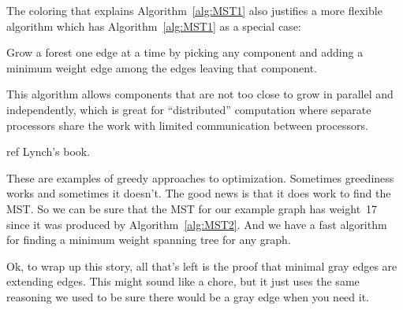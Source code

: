 The coloring that explains Algorithm~\ref{alg:MST1} also justifies a more
flexible algorithm which has Algorithm~\ref{alg:MST1} as a special case:
\begin{algorithm}\label{alg:MST3}
  Grow a forest one edge at a time by picking any component and adding a
  minimum weight edge among the edges leaving that component.
\end{algorithm}
This algorithm allows components that are not too close to grow in
parallel and independently, which is great for ``distributed'' computation
where separate processors share the work with limited communication
between processors.

\begin{editingnotes}
ref Lynch's book.
\end{editingnotes}

These are examples of greedy approaches to optimization.  Sometimes
greediness works and sometimes it doesn't.  The good news is that it
does work to find the MST.  So we can be sure that the MST for our
example graph has weight~17 since it was produced by
Algorithm~\ref{alg:MST2}.  And we have a fast algorithm for finding a
minimum weight spanning tree for any graph.

Ok, to wrap up this story, all that's left is the proof that minimal
gray edges are extending edges.  This might sound like a chore, but it
just uses the same reasoning we used to be sure there would be a gray
edge when you need it.

